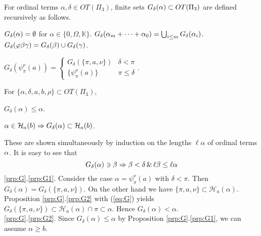 \documentclass{article}
\newcommand{\mK}{\mathbb{K}}
\begin{document}
\begin{definition}\label{df:EGFk}

{\rm 
For ordinal terms $\alpha,\delta\in OT(\Pi_{3})$, finite sets 
$G_{\delta}(\alpha)\subset OT(\Pi_{3})$ 
 are defined recursively as follows.
\benu

\item
$G_{\delta}(\alpha)=\emptyset$ for $\alpha\in\{0,\Omega,\mK\}$.
$G_{\delta}(\alpha_{m}+\cdots+\alpha_{0})=\bigcup_{i\leq m}G_{\delta}(\alpha_{i})$.
$G_{\delta}(\varphi\beta\gamma)=G_{\delta}(\beta)\cup G_{\delta}(\gamma)$.

\item
$\displaystyle{
G_{\delta}(\psi_{\pi}^{\nu}(a))=\left\{
\begin{array}{ll}
G_{\delta}(\{\pi,a,\nu\}) & \delta<\pi
\\
\{\psi_{\pi}^{\nu}(a)\} & \pi\leq\delta
\end{array}
\right.
}$.

\eenu

}
\end{definition}




\begin{proposition}\label{prp:G}
For $\{\alpha,\delta, a,b,\rho\}\subset OT(\Pi_{3})$,
\benu
\item\label{prp:G1}
$G_{\delta}(\alpha)\leq\alpha$.

\item\label{prp:G2}
$\alpha\in\mathcal{H}_{a}(b)
\Rightarrow G_{\delta}(\alpha)\subset\mathcal{H}_{a}(b)$.

\eenu
\end{proposition}
\bprf
These are shown simultaneously by induction on the lengths $\ell\alpha$ of ordinal terms $\alpha$.
It is easy to see that
\begin{equation}\label{eq:G}
G_{\delta}(\alpha)\ni\beta \Rightarrow \beta<\delta \,\&\, \ell\beta\leq \ell\alpha
\end{equation}
\ref{prp:G}.\ref{prp:G1}.
Consider the case $\alpha=\psi_{\pi}^{\nu}(a)$ with $\delta<\pi$.
Then $G_{\delta}(\alpha)=G_{\delta}(\{\pi,a,\nu\})$.
On the other hand we have  
$\{\pi,a,\nu\}\subset\mathcal{H}_{a}(\alpha)$.
Proposition \ref{prp:G}.\ref{prp:G2} with (\ref{eq:G}) 
yields 
$G_{\delta}(\{\pi,a,\nu\})\subset\mathcal{H}_{a}(\alpha)\cap\pi\subset\alpha$.
Hence $G_{\delta}(\alpha)<\alpha$.
\\
\ref{prp:G}.\ref{prp:G2}.
Since $G_{\delta}(\alpha)\leq\alpha$ by Proposition \ref{prp:G}.\ref{prp:G1}, we can assume $\alpha\geq b$.
\end{document}
